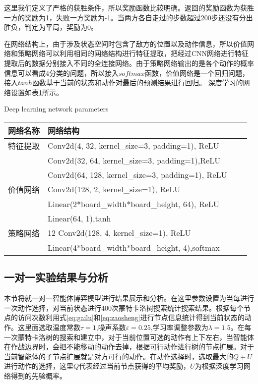 这里我们定义了严格的获胜条件，所以奖励函数比较明确。返回的奖励函数为获胜一方的奖励为1，失败一方奖励为-1。当两方各自走过的步数超过200步还没有分出胜负，判定为平局，奖励为0。

在网络结构上，由于涉及状态空间时包含了敌方的位置以及动作信息，所以价值网络和策略网络可以利用相同的网络结构进行特征提取，把经过CNN网络进行特征提取后的数据分别接入不同的全连接网络。由于策略网络输出的是各个动作的概率信息可以看成4分类的问题，所以接入$softmax$函数，价值网络是一个回归问题，接入$tanh$函数基于当前的状态和动作对最后的预测结果进行回归。
深度学习的网络设置如表\ref{tab4}所示。

\begin{table}[htbp]
	\centering
	{ Deep learning network parameters }
	\label{tab4}
	\begin{tabular}{llll} \toprule
		网络名称   & 网络结构  \\  \midrule
		特征提取 &	Conv2d(4, 32, kernel\_size=3, padding=1), ReLU\\
		&	Conv2d(32, 64, kernel\_size=3, padding=1),ReLU\\
		&	Conv2d(64, 128, kernel\_size=3, padding=1), ReLU\\
		价值网络&Conv2d(128, 2, kernel\_size=1), ReLU\\
		&Linear(2*board\_width*board\_height, 64), ReLU\\
		&Linear(64, 1),tanh\\
		策略网络&12 Conv2d(128, 4, kernel\_size=1), ReLU\\
		&Linear(4*board\_width*board\_height,
		4),softmax\\
		
		\bottomrule
	\end{tabular}
\end{table}


\subsection{一对一实验结果与分析}
本节将就一对一智能体博弈模型进行结果展示和分析。在这里参数设置为当每进行一次动作选择，对当前状态进行400次蒙特卡洛树搜索统计搜索结果。根据每个节点的访问次数利用式\ref{eq:gailu}和\ref{eq:zaosheng}进行节点信息统计得到当前状态的动作。这里面选取温度常数$\tau=1$,噪声系数$\varepsilon=0.25$,学习率调整参数为$\lambda=1.5$。在每一次蒙特卡洛树的搜索和建立中，对于当前位置可选的动作有上下左右，当智能体在作战边界时，会把不能移动的动作去掉，根据可行动作进行树的节点扩展。对于当前智能体的子节点扩展就是对方可行的动作。在动作选择时，选取最大的$Q+U$进行动作的选择，这里$Q$代表经过当前节点获得的平均奖励，$U$为根据深度学习网络得到的先验概率。


